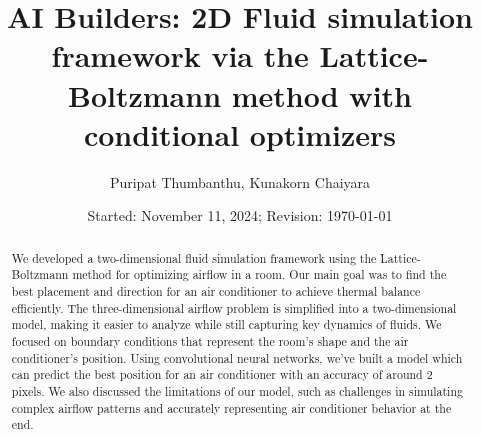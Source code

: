 \documentclass[b5paper, 11pt, openleft]{memoir}
\begin{document}
\frontmatter
\title{
	\vspace{-5em}
	\textbf{
		AI Builders: 2D Fluid simulation framework via the Lattice-Boltzmann method with conditional optimizers
	}
}
\author{
	Puripat Thumbanthu, Kunakorn Chaiyara \\
}
\date{Started: November 11, 2024; Revision: \today}
\maketitle

\begin{abstract}
We developed a two-dimensional fluid simulation framework using the Lattice-Boltzmann method for optimizing airflow in a room. Our main goal was to find the best placement and direction for an air conditioner to achieve thermal balance efficiently. The three-dimensional airflow problem is simplified into a two-dimensional model, making it easier to analyze while still capturing key dynamics of fluids. We focused on boundary conditions that represent the room's shape and the air conditioner's position. Using convolutional neural networks, we've built a model which can predict the best position for an air conditioner with an accuracy of around $2$ pixels. We also discussed the limitations of our model, such as challenges in simulating complex airflow patterns and accurately representing air conditioner behavior at the end.
\end{abstract}

\tableofcontents*

\mainmatter






\printbibliography
\end{document}
